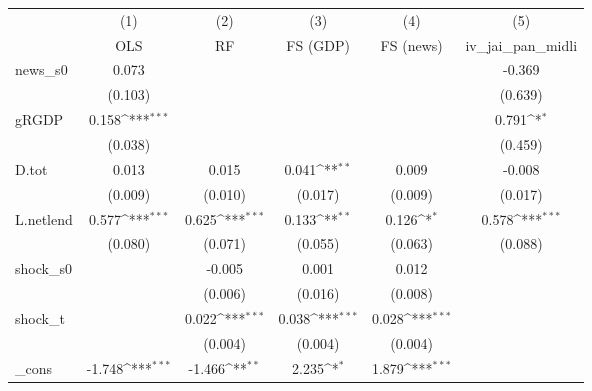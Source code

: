 {
\def\sym#1{\ifmmode^{#1}\else\(^{#1}\)\fi}
\begin{tabular}{l*{5}{c}}
\toprule
            &\multicolumn{1}{c}{(1)}&\multicolumn{1}{c}{(2)}&\multicolumn{1}{c}{(3)}&\multicolumn{1}{c}{(4)}&\multicolumn{1}{c}{(5)}\\
            &\multicolumn{1}{c}{OLS}&\multicolumn{1}{c}{RF}&\multicolumn{1}{c}{FS (GDP)}&\multicolumn{1}{c}{FS (news)}&\multicolumn{1}{c}{iv\_jai\_pan\_midli}\\
\midrule
news\_s0     &       0.073         &                     &                     &                     &      -0.369         \\
            &     (0.103)         &                     &                     &                     &     (0.639)         \\
\addlinespace
gRGDP       &       0.158\sym{***}&                     &                     &                     &       0.791\sym{*}  \\
            &     (0.038)         &                     &                     &                     &     (0.459)         \\
\addlinespace
D.tot       &       0.013         &       0.015         &       0.041\sym{**} &       0.009         &      -0.008         \\
            &     (0.009)         &     (0.010)         &     (0.017)         &     (0.009)         &     (0.017)         \\
\addlinespace
L.netlend   &       0.577\sym{***}&       0.625\sym{***}&       0.133\sym{**} &       0.126\sym{*}  &       0.578\sym{***}\\
            &     (0.080)         &     (0.071)         &     (0.055)         &     (0.063)         &     (0.088)         \\
\addlinespace
shock\_s0    &                     &      -0.005         &       0.001         &       0.012         &                     \\
            &                     &     (0.006)         &     (0.016)         &     (0.008)         &                     \\
\addlinespace
shock\_t     &                     &       0.022\sym{***}&       0.038\sym{***}&       0.028\sym{***}&                     \\
            &                     &     (0.004)         &     (0.004)         &     (0.004)         &                     \\
\addlinespace
\_cons      &      -1.748\sym{***}&      -1.466\sym{**} &       2.235\sym{*}  &       1.879\sym{***}&                     \\

\end{tabular}}
